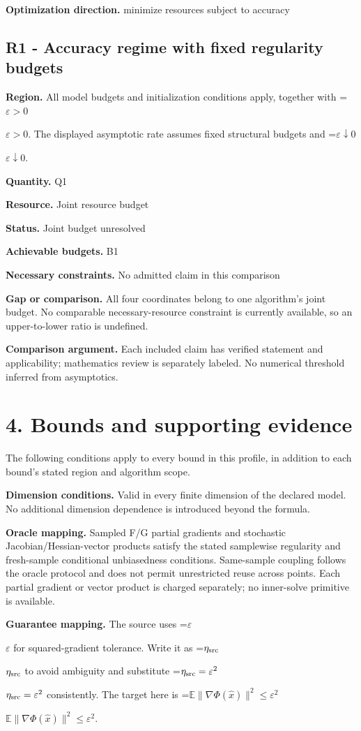 \documentclass[10pt,a4paper]{article}
\newcommand{\AtlasMath}[1]{\par\begingroup\centering\setbox0=\hbox{$\displaystyle #1$}\ifdim\wd0>1.4\linewidth\typeout{ATLAS WIDE FORMULA: \the\wd0}\fi\ifdim\wd0>\linewidth\resizebox{\linewidth}{!}{\box0}\else\box0\fi\par\endgroup}
\newcommand{\AtlasInlineMath}[1]{\begingroup\setbox0=\hbox{$#1$}\ifdim\wd0>.4\linewidth\endgroup\AtlasMath{#1}\else\endgroup$#1$\fi}
\begin{document}
\textbf{Optimization direction.} minimize resources subject to accuracy

\subsection{R1 - Accuracy regime with fixed regularity budgets}
\textbf{Region.} All model budgets and initialization conditions apply, together with \AtlasInlineMath{\varepsilon>0}. The displayed asymptotic rate assumes fixed structural budgets and \AtlasInlineMath{\varepsilon\downarrow0}.

\textbf{Quantity.} Q1

\textbf{Resource.} Joint resource budget

\textbf{Status.} Joint budget unresolved

\textbf{Achievable budgets.} B1

\textbf{Necessary constraints.} No admitted claim in this comparison

\textbf{Gap or comparison.} All four coordinates belong to one algorithm’s joint budget. No comparable necessary-resource constraint is currently available, so an upper-to-lower ratio is undefined.

\textbf{Comparison argument.} Each included claim has verified statement and applicability; mathematics review is separately labeled. No numerical threshold inferred from asymptotics.

\section{4. Bounds and supporting evidence}
The following conditions apply to every bound in this profile, in addition to each bound's stated region and algorithm scope.

\textbf{Dimension conditions.} Valid in every finite dimension of the declared model. No additional dimension dependence is introduced beyond the formula.

\textbf{Oracle mapping.} Sampled F/G partial gradients and stochastic Jacobian/Hessian-vector products satisfy the stated samplewise regularity and fresh-sample conditional unbiasedness conditions. Same-sample coupling follows the oracle protocol and does not permit unrestricted reuse across points. Each partial gradient or vector product is charged separately; no inner-solve primitive is available.

\textbf{Guarantee mapping.} The source uses \AtlasInlineMath{\varepsilon} for squared-gradient tolerance. Write it as \AtlasInlineMath{\eta_{\rm src}} to avoid ambiguity and substitute \AtlasInlineMath{\eta_{\rm src}=\varepsilon^2} consistently. The target here is \AtlasInlineMath{\mathbb E\|\nabla\Phi(\widehat x)\|^2\le\varepsilon^2}.
\end{document}
